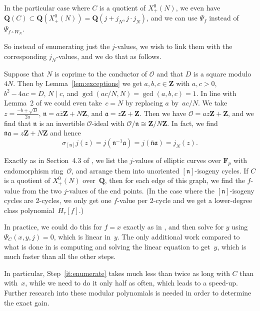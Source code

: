 \documentclass{amsart}
\newcommand{\QQ}{\mathbf{Q}}
\newcommand{\ZZ}{\mathbf{Z}}
\newcommand{\FF}{\mathbf{F}}
\newcommand{\Ff}{H_\tau[f]}
\newcommand{\mc}{\mathcal}
\newcommand{\fraka}{\mathfrak{a}}
\newcommand{\xplus}[1]{X^0_+(#1)}
\newcommand{\xplusN}{\xplus{N}}
\numberwithin{equation}{section}
\theoremstyle{definition}
\begin{document}
    In the particular case where $C$ is a quotient of $\xplusN$, we even have
    $\QQ(C)\subset \QQ(\xplusN) = \QQ(j+ j_N,j\cdot j_N)$,
    and we can use $\Psi_{f}$ instead of $\Psi_{f\circ W_N}$.
    
    So instead of enumerating just the $j$-values, we wish to link them with the corresponding
    $j_N$-values, and we do that as follows.
    
    Suppose that $N$ is coprime to the conductor of $\mc{O}$ and that
    $D$ is a square modulo~$4N$. Then by Lemma~\ref{lem:exceptions}
    we get $a,b,c\in\ZZ$ with $a,c>0$, $b^2-4ac = D$, $N\mid c$, and
    $\gcd(ac/N,N)=\gcd(a,b,c)=1$.
    In line with Lemma~2 of \cite{enge-sutherland2010} we could even take~$c=N$
    by replacing $a$ by~$ac/N$.
    We take $z = \frac{-b+\sqrt{D}}{2a}$, $\mathfrak{n} = a\overline{z}\ZZ+N\ZZ$,
    and $\fraka = z\ZZ+\ZZ$.
    Then we have $\mc{O} = az\ZZ+\ZZ$,
    and we find that $\mathfrak{n}$ is an invertible $\mc{O}$-ideal 
    with $\mc{O}/\mathfrak{n}\cong \ZZ/N\ZZ$.
    In fact, we find $\overline{\mathfrak{n}}\fraka = z\ZZ+N\ZZ$ and hence
    $$\sigma_{[\mathfrak{n}]}j(z) = j(\mathfrak{n}^{-1}\fraka) 
    =  j(\overline{\mathfrak{n}}\fraka) = j_N(z).$$

    Exactly as in Section~4.3 of \cite{enge-sutherland2010}, we list 
    the $j$-values of elliptic curves over $\FF_p$ with
    endomorphism ring~$\mc{O}$, and arrange them into
    unoriented $[\mathfrak{n}]$-isogeny cycles.
    If $C$ is a quotient of $\xplusN$ over~$\QQ$,
    then for each edge of this graph, we find the $f$-value from the
    two $j$-values of the end points.
    (In the case where the $[\mathfrak{n}]$-isogeny cycles are 2-cycles,
    we only get one $f$-value per 2-cycle and we get a lower-degree class polynomial~$\Ff$.)
    
    In practice, we could do this for $f=x$
    exactly as in \cite{enge-sutherland2010}, and then solve for $y$
    using $\Psi_{C}(x,y,j)=0$, which is linear in~$y$.
    The only additional work compared to what is done in \cite{enge-sutherland2010}
    is computing and solving the linear equation to get~$y$, which
    is much faster than all the other steps. 
    
    In particular, Step~\ref{it:enumerate} takes much less
    than twice as long with $C$ than with~$x$,
    while we need to do it only half as often,
    which leads to a speed-up.
    Further research into these modular polynomials
    is needed in order to determine the exact gain.
    
\end{document}
